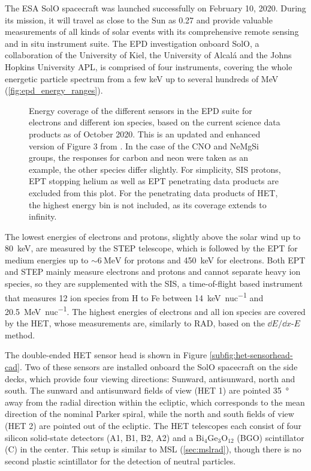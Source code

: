 The ESA \acl{SolO} spacecraft \citep[\acs{SolO},][]{Mueller-2020-SolO} was launched successfully on February 10, 2020. During its mission, it will travel as close to the Sun as \SI{0.27}{\AU} and provide valuable measurements of all kinds of solar events with its comprehensive remote sensing and in situ instrument suite. The \acl{EPD} investigation \citep[\acs{EPD},][]{RodriguezPacheco-2019-EPD} onboard \ac{SolO}, a collaboration of the University of Kiel, the University of Alcalá and the Johns Hopkins University APL, is comprised of four instruments, covering the whole energetic particle spectrum from a few \si{\kilo\electronvolt} up to several hundreds of \si{\mega\electronvolt} (\autoref{fig:epd_energy_ranges}).
\begin{figure}
	\centering
	
	\caption[\acs{EPD} energy coverage]{Energy coverage of the different sensors in the \ac{EPD} suite for electrons and different ion species, based on the current science data products as of October 2020. This is an updated and enhanced version of Figure 3 from \citet{RodriguezPacheco-2019-EPD}. In the case of the CNO and NeMgSi groups, the responses for carbon and neon were taken as an example, the other species differ slightly. For simplicity, \acs{SIS} protons, \acs{EPT} stopping helium as well as \acs{EPT} penetrating data products are excluded from this plot. For the penetrating data products of \acs{HET}, the highest energy bin \citep[as given by][Appendix A]{Elftmann-2020-PhD} is not included, as its coverage extends to infinity.}
	\label{fig:epd_energy_ranges}
\end{figure}
The lowest energies of electrons and protons, slightly above the solar wind up to \SI{80}{\kilo\electronvolt}, are measured by the \ac{STEP} telescope, which is followed by the \ac{EPT} for medium energies up to $\sim\SI{6}{\mega\electronvolt}$ for protons and \SI{450}{\kilo\electronvolt} for electrons. Both \ac{EPT} and \ac{STEP} mainly measure electrons and protons and cannot separate heavy ion species, so they are supplemented with the \ac{SIS}, a time-of-flight based instrument that measures 12 ion species from H to Fe between \SI{14}{\kilo\electronvolt\per nuc} and \SI{20.5}{\mega\electronvolt\per nuc}. The highest energies of electrons and all ion species are covered by the \ac{HET}, whose measurements are, similarly to \ac{RAD}, based on the $\dd E/\dd x$-$E$ method.

The double-ended \ac{HET} sensor head is shown in Figure \ref{subfig:het-sensorhead-cad}. Two of these sensors are installed onboard the \ac{SolO} spacecraft on the side decks, which provide four viewing directions: Sunward, antisunward, north and south. The sunward and antisunward fields of view (HET 1) are pointed \SI{35}{\degree} away from the radial direction within the ecliptic, which corresponds to the mean direction of the nominal Parker spiral, while the north and south fields of view (HET 2) are pointed out of the ecliptic. The \ac{HET} telescopes each consist of four silicon solid-state detectors (A1, B1, B2, A2) and a Bi$_4$Ge$_3$O$_{12}$ (BGO) scintillator (C) in the center. This setup is similar to \ac{MSL} (\autoref{sec:mslrad}), though there is no second plastic scintillator for the detection of neutral particles.

